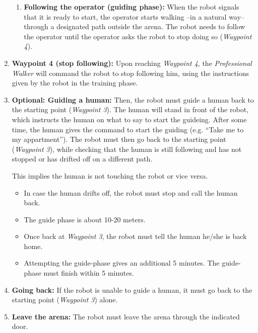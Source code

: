 \begin{enumerate}
\begin{enumerate}
	\item \textbf{Following the operator (guiding phase):} 
	When the robot signals that it is ready to start, the operator starts walking --in a natural way-- through a designated path outside the arena. 
	The robot needs to follow the operator until the operator asks the robot to stop doing so (\textit{Waypoint 4}).
	\end{enumerate}

	\item \textbf{Waypoint 4 (stop following):} Upon reaching \textit{Waypoint 4}, 
	  the \textit{Professional Walker} will command the robot to stop following him, using the instructions given by the robot in the training phase.
	
	\item \textbf{Optional: Guiding a human:} Then, the robot must guide a human back to the starting point (\textit{Waypoint 3}).
	The human will stand in front of the robot, which instructs the human on what to say to start the guideing. 
	After some time, the human gives the command to start the guiding (e.g. ``Take me to my appartment'').
	The robot must then go back to the starting point (\textit{Waypoint 3}), while checking that the human is still following and has not stopped or has drifted off on a different path.
	
	This implies the human is not touching the robot or vice versa. 
	
	\begin{itemize}
	 \item In case the human drifts off, the robot must stop and call the human back. 
	 \item The guide phase is about 10-20 meters.
	 \item Once back at \textit{Waypoint 3}, the robot must tell the human he/she is back home. 
	 \item Attempting the guide-phase gives an additional 5 minutes. 
	  The guide-phase must finish within 5 minutes. 
	\end{itemize}
	
	\item \textbf{Going back:} If the robot is unable to guide a human, it must go back to the starting point (\textit{Waypoint 3}) alone. 
	
	\item \textbf{Leave the arena:} The robot must leave the arena through the indicated door.
\end{enumerate}


